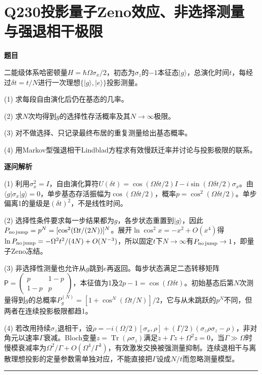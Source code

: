 \documentclass[UTF8,a4paper,11pt,oneside,openany]{ctexbook}
\begin{document}
\section*{Q230\quad 投影量子Zeno效应、非选择测量与强退相干极限}
\textbf{题目}\par
二能级体系哈密顿量$H=\hbar\Omega\sigma_x/2$，初态为$\sigma_z$的$-1$本征态$|g\rangle$，总演化时间$t$，每经过$\delta t=t/N$进行一次理想$\{|g\rangle,|e\rangle\}$投影测量。
\par\smallskip\noindent (1) 求每段自由演化后仍在基态的几率。
\par\smallskip\noindent (2) 求$N$次均得到$g$的选择性存活概率及其$N\to\infty$极限。
\par\smallskip\noindent (3) 对不做选择、只记录最终布居的重复测量给出基态概率。
\par\smallskip\noindent (4) 用Markov型强退相干Lindblad方程求有效慢跃迁率并讨论与投影极限的联系。
\par\medskip\textbf{逐问解析}\par
\par\smallskip\noindent (1) 利用$\sigma_x^2=I$，自由演化算符$U(\delta t)=\cos(\Omega\delta t/2)I-i\sin(\Omega\delta t/2)\sigma_x$。由$\langle g|\sigma_x|g\rangle=0$，单步基态存活振幅为$\cos(\Omega\delta t/2)$，概率$p=\cos^2(\Omega\delta t/2)$。单步偏离1的量级是$(\delta t)^2$，不是线性时间。
\par\smallskip\noindent (2) 选择性条件要求每一步结果都为$g$，各步状态重置到$|g\rangle$，因此$P_{\rm no\,jump}=p^N=[\cos^2(\Omega t/(2N))]^N$。展开$\ln\cos^2x=-x^2+O(x^4)$得$\ln P_{\rm no\,jump}=-\Omega^2t^2/(4N)+O(N^{-3})$，所以固定$t$下$N\to\infty$有$P_{\rm no\,jump}\to1$，即量子Zeno冻结。
\par\smallskip\noindent (3) 非选择性测量也允许从$g$跳到$e$再返回。每步状态满足二态转移矩阵$\mathsf P=\begin{pmatrix}p&1-p\\1-p&p\end{pmatrix}$，本征值为1及$2p-1=\cos(\Omega\delta t)$。初始基态后第$N$次测量得到$g$的总概率$P_g^{(N)}=[1+\cos^N(\Omega t/N)]/2$，它与从未跳跃的$p^N$不同，但两者在连续投影极限都趋1。
\par\smallskip\noindent (4) 若改用持续$\sigma_z$退相干，设$\dot\rho=-i(\Omega/2)[\sigma_x,\rho]+(\Gamma/2)(\sigma_z\rho\sigma_z-\rho)$，非对角元以速率$\Gamma$衰减。Bloch变量$z=\operatorname{Tr}(\rho\sigma_z)$满足$\ddot z+\Gamma\dot z+\Omega^2z=0$，当$\Gamma\gg\Omega$时慢模衰减率为$\Omega^2/\Gamma+O(\Omega^4/\Gamma^3)$，有效激发交换被强测量抑制。连续退相干与离散理想投影的定量参数需单独对应，不能直接把$\Gamma$设成$N/t$而忽略测量模型。
\par\medskip\hrule\medskip
\end{document}
